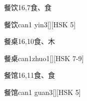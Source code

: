 \begin{Entry}{餐饮}{16,7}{⾷、⾷}
  \begin{Phonetics}{餐饮}{can1 yin3}[][HSK 5]
  \end{Phonetics}
\end{Entry}

\begin{Entry}{餐桌}{16,10}{⾷、⽊}
  \begin{Phonetics}{餐桌}{can1zhuo1}[][HSK 7-9]
  \end{Phonetics}
\end{Entry}

\begin{Entry}{餐馆}{16,11}{⾷、⾷}
  \begin{Phonetics}{餐馆}{can1 guan3}[][HSK 5]
  \end{Phonetics}
\end{Entry}


